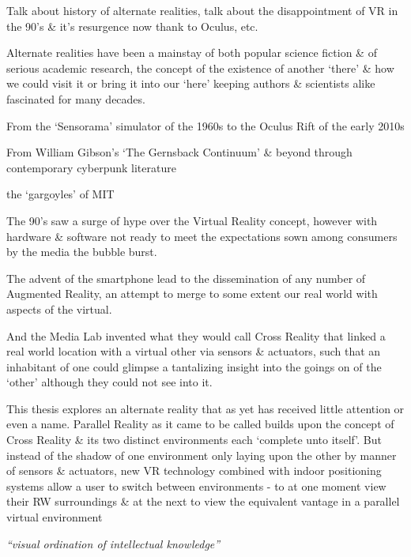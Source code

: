 


Talk about history of alternate realities, talk about the disappointment of VR in the 90's \& it's resurgence now thank to Oculus, etc.






Alternate realities have been a mainstay of both popular science fiction \& of serious academic research, the concept of the existence of another `there' \& how we could visit it or bring it into our `here'
keeping authors \& scientists alike fascinated for many decades.

From the `Sensorama' simulator of the 1960s to the Oculus Rift of the early 2010s

From William Gibson's `The Gernsback Continuum' \& beyond through contemporary cyberpunk literature

the `gargoyles' of MIT


The 90's saw a surge of hype over the Virtual Reality concept, however with hardware \& software not ready to meet the expectations sown among consumers by the media the bubble burst.

The advent of the smartphone lead to the dissemination of any number of Augmented Reality, an attempt to merge to some extent our real world with aspects of the virtual.


And the Media Lab invented what they would call Cross Reality that linked a real world location with a virtual other via sensors \& actuators, such that an inhabitant of one could glimpse a tantalizing insight into the goings on of the `other' although they could not see into it.

This thesis explores an alternate reality that as yet has received little attention or even a name. Parallel Reality as it came to be called builds upon the concept of Cross Reality \& its two distinct environments each `complete unto itself'. But instead of the shadow of one environment only laying upon the other by manner of sensors \& actuators, new VR technology combined with indoor positioning systems allow a user to switch between environments - to at one moment view their RW surroundings \& at the next to view the equivalent vantage in a parallel virtual environment


\textit{``visual ordination of intellectual knowledge''}

